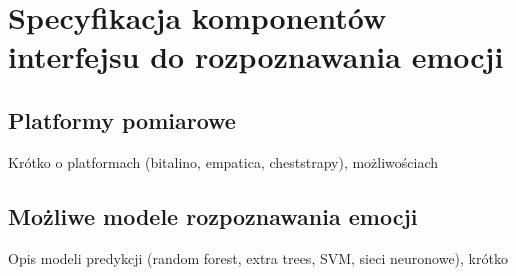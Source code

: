 \chapter{Specyfikacja komponentów interfejsu do rozpoznawania emocji}
\label{cha:specyfikacja}
\section{Platformy pomiarowe}
Krótko o platformach (bitalino, empatica, cheststrapy), możliwościach 
\section{Możliwe modele rozpoznawania emocji}
Opis modeli predykcji (random forest, extra trees, SVM, sieci neuronowe), krótko